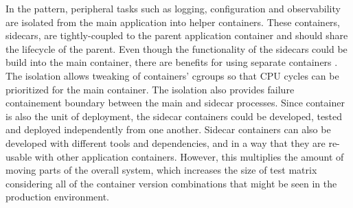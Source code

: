 \documentclass[english, 12pt, a4paper, sci, utf8, a-2b, online]{aaltothesis}
\begin{document}

In the pattern, peripheral tasks such as logging, configuration and observability are isolated from the main application into helper containers. These containers, sidecars, are tightly-coupled to the parent application container and should share the lifecycle of the parent. Even though the functionality of the sidecars could be build into the main container, there are benefits for using separate containers \cite{burns2016design}. The isolation allows tweaking of containers' cgroups so that CPU cycles can be prioritized for the main container. The isolation also provides failure containement boundary between the main and sidecar processes. Since container is also the unit of deployment, the sidecar containers could be developed, tested and deployed independently from one another. Sidecar containers can also be developed with different tools and dependencies, and in a way that they are re-usable with other application containers. However, this multiplies the amount of moving parts of the overall system, which increases the size of test matrix considering all of the container version combinations that might be seen in the production environment.
\end{document}

